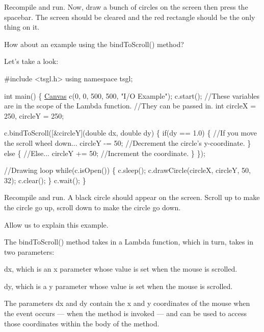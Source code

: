 Recompile and run. Now, draw a bunch of circles on the screen then press the spacebar. The screen should be cleared and the red rectangle should be the only thing on it.

How about an example using the {\ttfamily bind\-To\-Scroll()} method?

Let's take a look\-:


\begin{DoxyCode}
\textcolor{preprocessor}{#include <tsgl.h>}
\textcolor{keyword}{using namespace }tsgl;

\textcolor{keywordtype}{int} main() \{
  \hyperlink{classtsgl_1_1_canvas}{Canvas} c(0, 0, 500, 500, \textcolor{stringliteral}{"I/O Example"});
  c.start();
  \textcolor{comment}{//These variables are in the scope of the Lambda function.}
  \textcolor{comment}{//They can be passed in.}
  \textcolor{keywordtype}{int} circleX = 250, circleY = 250;

  c.bindToScroll([&circleY](\textcolor{keywordtype}{double} dx, \textcolor{keywordtype}{double} dy) \{
    \textcolor{keywordflow}{if}(dy == 1.0) \{ \textcolor{comment}{//If you move the scroll wheel down...}
      circleY -= 50;  \textcolor{comment}{//Decrement the circle's y-coordinate.}
    \} \textcolor{keywordflow}{else} \{ \textcolor{comment}{//Else...}
      circleY += 50;  \textcolor{comment}{//Increment the coordinate.}
    \}
  \});

  \textcolor{comment}{//Drawing loop}
  \textcolor{keywordflow}{while}(c.isOpen()) \{
    c.sleep();
    c.drawCircle(circleX, circleY, 50, 32);
    c.clear();
  \}
  c.wait();
\}
\end{DoxyCode}


Recompile and run. A black circle should appear on the screen. Scroll up to make the circle go up, scroll down to make the circle go down.

Allow us to explain this example.

The bind\-To\-Scroll() method takes in a Lambda function, which in turn, takes in two parameters\-:


\begin{DoxyItemize}
\item dx, which is an x parameter whose value is set when the mouse is scrolled.
\item dy, which is a y parameter whose value is set when the mouse is scrolled.
\end{DoxyItemize}

The parameters dx and dy contain the x and y coordinates of the mouse when the event occurs — when the method is invoked — and can be used to access those coordinates within the body of the method.

